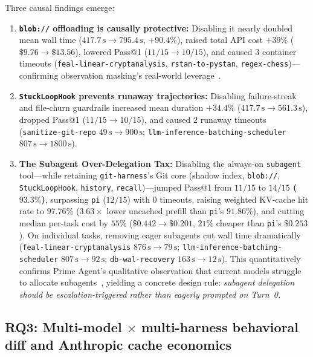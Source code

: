 \documentclass[11pt]{article}
\newcommand{\code}[1]{\nolinkurl{#1}}
\begin{document}
Three causal findings emerge:
\begin{enumerate}[leftmargin=*,nosep]
  \item \textbf{\texttt{blob://} offloading is causally protective:} Disabling it nearly doubled mean wall time ($417.7\,\mathrm{s} \to 795.4\,\mathrm{s}$, $+90.4\%$), raised total API cost $+39\%$ ($\$9.76 \to \$13.56$), lowered Pass@1 ($11/15 \to 10/15$), and caused $3$ container timeouts (\code{feal-linear-cryptanalysis}, \code{rstan-to-pystan}, \code{regex-chess})---confirming observation masking's real-world leverage~\citep{lindenbauer2025complexity}.
  \item \textbf{\texttt{StuckLoopHook} prevents runaway trajectories:} Disabling failure-streak and file-churn guardrails increased mean duration $+34.4\%$ ($417.7\,\mathrm{s} \to 561.3\,\mathrm{s}$), dropped Pass@1 ($11/15 \to 10/15$), and caused $2$ runaway timeouts (\code{sanitize-git-repo} $49\,\mathrm{s} \to 900\,\mathrm{s}$; \code{llm-inference-batching-scheduler} $807\,\mathrm{s} \to 1800\,\mathrm{s}$).
  \item \textbf{The Subagent Over-Delegation Tax:} Disabling the always-on \texttt{subagent} tool---while retaining \texttt{git-harness}'s Git core (shadow index, \texttt{blob://}, \texttt{StuckLoopHook}, \texttt{history}, \texttt{recall})---jumped Pass@1 from $11/15$ to \textbf{$14/15$ ($93.3\%$)}, surpassing \texttt{pi} ($12/15$) with $0$ timeouts, raising weighted KV-cache hit rate to \textbf{$97.76\%$} ($3.63\times$ lower uncached prefill than \texttt{pi}'s $91.86\%$), and cutting median per-task cost by \textbf{$55\%$} ($\$0.442 \to \$0.201$, $21\%$ cheaper than \texttt{pi}'s $\$0.253$). On individual tasks, removing eager subagents cut wall time dramatically (\code{feal-linear-cryptanalysis} $876\,\mathrm{s} \to 79\,\mathrm{s}$; \code{llm-inference-batching-scheduler} $807\,\mathrm{s} \to 92\,\mathrm{s}$; \code{db-wal-recovery} $163\,\mathrm{s} \to 12\,\mathrm{s}$). This quantitatively confirms Prime Agent's qualitative observation that current models struggle to allocate subagents~\citep{karten2026primeagent}, yielding a concrete design rule: \emph{subagent delegation should be escalation-triggered rather than eagerly prompted on Turn~0.}
\end{enumerate}

\subsection{RQ3: Multi-model $\times$ multi-harness behavioral diff and Anthropic cache economics}
\label{sec:rq3-matrix}
\end{document}
